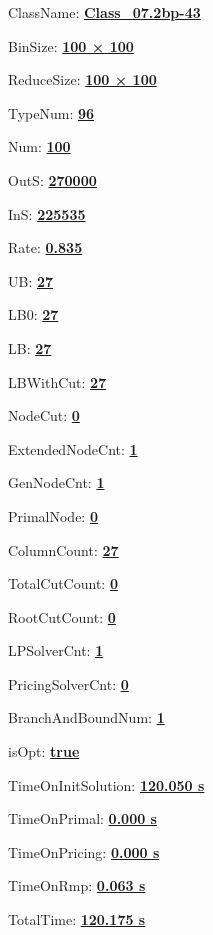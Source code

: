 \documentclass[11pt]{article}
\begin{document}
\pagestyle{empty}


ClassName: \underline{\textbf{Class_07.2bp-43}}
\par
BinSize: \underline{\textbf{100 × 100}}
\par
ReduceSize: \underline{\textbf{100 × 100}}
\par
TypeNum: \underline{\textbf{96}}
\par
Num: \underline{\textbf{100}}
\par
OutS: \underline{\textbf{270000}}
\par
InS: \underline{\textbf{225535}}
\par
Rate: \underline{\textbf{0.835}}
\par
UB: \underline{\textbf{27}}
\par
LB0: \underline{\textbf{27}}
\par
LB: \underline{\textbf{27}}
\par
LBWithCut: \underline{\textbf{27}}
\par
NodeCut: \underline{\textbf{0}}
\par
ExtendedNodeCnt: \underline{\textbf{1}}
\par
GenNodeCnt: \underline{\textbf{1}}
\par
PrimalNode: \underline{\textbf{0}}
\par
ColumnCount: \underline{\textbf{27}}
\par
TotalCutCount: \underline{\textbf{0}}
\par
RootCutCount: \underline{\textbf{0}}
\par
LPSolverCnt: \underline{\textbf{1}}
\par
PricingSolverCnt: \underline{\textbf{0}}
\par
BranchAndBoundNum: \underline{\textbf{1}}
\par
isOpt: \underline{\textbf{true}}
\par
TimeOnInitSolution: \underline{\textbf{120.050 s}}
\par
TimeOnPrimal: \underline{\textbf{0.000 s}}
\par
TimeOnPricing: \underline{\textbf{0.000 s}}
\par
TimeOnRmp: \underline{\textbf{0.063 s}}
\par
TotalTime: \underline{\textbf{120.175 s}}
\par
\newpage


\end{document}
